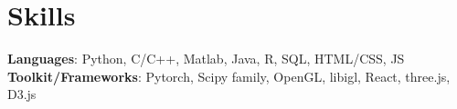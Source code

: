 \documentclass[letterpaper,10pt]{article}
\begin{document}
%
\section{Skills}
 \begin{itemize}[leftmargin=0.15in, label={}]
    \small{\item{
     \textbf{Languages}{: Python,  C/C++, Matlab, Java, R, SQL, HTML/CSS, JS} \\
     \textbf{Toolkit/Frameworks}{: Pytorch, Scipy family, OpenGL, libigl, React, three.js, D3.js}
    }}
 \end{itemize}



  
\end{document}
